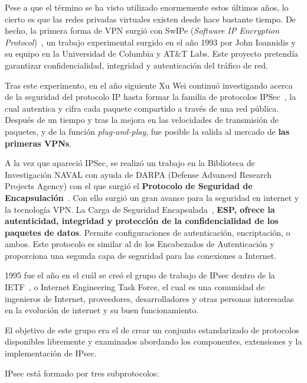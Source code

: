 Pese a que el término se ha visto utilizado enormemente estos últimos años, lo cierto es que las redes privadas virtuales existen desde hace bastante tiempo.
De hecho, la primera forma de VPN surgió con SwIPe (\textit{Software IP Encryption Protocol})~\cite{article:swipe}, un trabajo experimental surgido en el año 1993 por John Ioannidis y su equipo en la Universidad de Columbia y AT\&T Labs. Este proyecto pretendía garantizar confidencialidad, integridad y autenticación del tráfico de red.

Tras este experimento, en el año siguiente Xu Wei continuó investigando acerca de la seguridad del protocolo IP hasta formar la familia de protocolos IPSec~\cite{article:ipsec}, la cual autentica y cifra cada paquete compartido a través de una red pública. Después de un tiempo y tras la mejora en las velocidades de transmisión de paquetes, y de la función \textit{plug-and-play}, fue posible la salida al mercado de \textbf{las primeras VPNs}.

A la vez que apareció IPSec, se  realizó un trabajo en la Biblioteca de Investigación NAVAL con ayuda de DARPA (Defense Advanced Research Projects Agency) con el que surgió el \textbf{Protocolo de Seguridad de Encapsulación}~\cite{article:levpn}. 
Con ello surgió un gran avance para la seguridad en internet y la tecnología VPN. 
La Carga de Seguridad Encapsulada~\cite{article:esp}, \textbf{ESP, ofrece la autenticidad, integridad y protección de la confidencialidad de los paquetes de datos}. 
Permite configuraciones de autenticación, encriptación, o ambos. 
Este protocolo es similar al de los Encabezados de Autenticación y proporciona una segunda capa de seguridad para las conexiones a Internet. 

1995 fue el año en el cuál se creó el grupo de trabajo de IPsec dentro de la IETF~\cite{article:ietf}, o Internet Engineering Task Force, el cual es una comunidad de ingenieros de Internet, proveedores, desarrolladores y otras personas interesadas en la evolución de internet y su buen funcionamiento. 

El objetivo de este grupo era el de crear un conjunto estandarizado de protocolos disponibles libremente y examinados abordando los componentes, extensiones y la implementación de IPsec.

IPsec está formado por tres subprotocolos:

